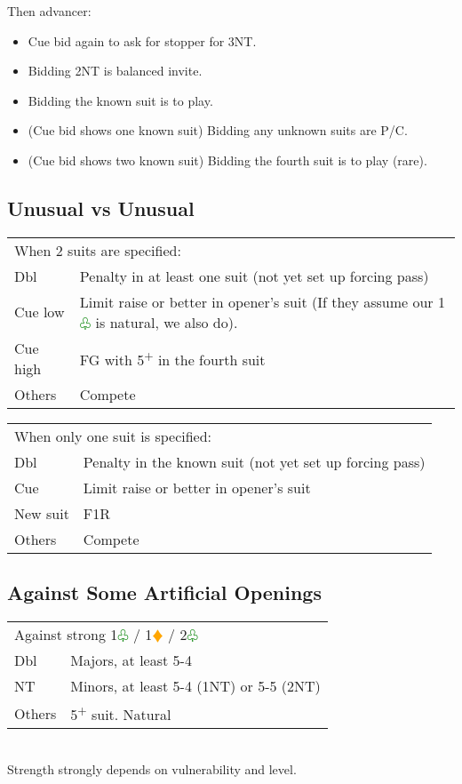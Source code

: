 \documentclass{article}
\newcommand{\di}{\textcolor{Orange}{$\vardiamond$}}
\newcommand{\cl}{\textcolor{Green}{$\varclub$}}
\newcommand{\nt}{\relsize{-1}NT\relsize{1}}
\newcommand{\up}{\textsuperscript{+}}
\begin{document}
Then advancer:
\begin{itemize}
\itemsep0em
	\item Cue bid again to ask for stopper for 3\nt{}.
	\item Bidding 2\nt{} is balanced invite.
	\item Bidding the known suit is to play.
	\item (Cue bid shows one known suit) Bidding any unknown suits are P/C.
	\item (Cue bid shows two known suit) Bidding the fourth suit is to play (rare).
\end{itemize}

\subsection{Unusual vs Unusual}

\begin{tabular}{|l|p{6.5cm}}
	\multicolumn{2}{l}{When 2 suits are specified:} \\
    Dbl & Penalty in at least one suit (not yet set up forcing pass) \\
    Cue low & Limit raise or better in opener's suit (If they assume our 1\cl{} is natural, we also do). \\
    Cue high & FG with 5\up{} in the fourth suit \\
    Others & Compete \\
\end{tabular}

\medskip

\begin{tabular}{|l|p{6.5cm}}
	\multicolumn{2}{l}{When only one suit is specified:} \\
    Dbl & Penalty in the known suit (not yet set up forcing pass) \\
    Cue & Limit raise or better in opener's suit \\
    New suit & F1R \\
    Others & Compete
\end{tabular}

\subsection{Against Some Artificial Openings}

\begin{tabular}{|l|p{6.5cm}}
	\multicolumn{2}{l}{Against strong 1\cl{} / 1\di{} / 2\cl{}} \\
    Dbl & Majors, at least 5-4 \\
    \nt & Minors, at least 5-4 (1\nt{}) or 5-5 (2\nt{}) \\
    Others & 5\up{} suit. Natural
\end{tabular}\\
Strength strongly depends on vulnerability and level. \\
\end{document}
